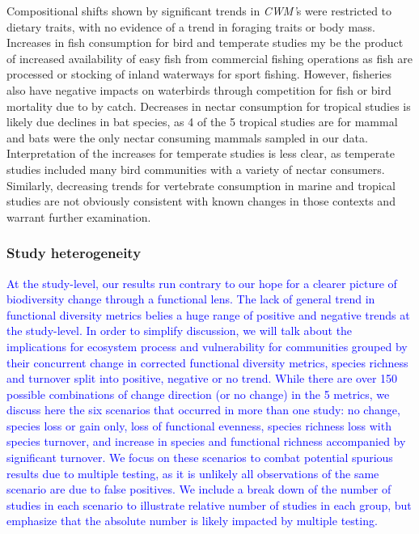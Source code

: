 \documentclass{article}
\begin{document}
Compositional shifts shown by significant trends in \emph{CWM'}s were
restricted to dietary traits, with no evidence of a trend in foraging
traits or body mass. Increases in fish consumption for bird and
temperate studies my be the product of increased availability of easy
fish from commercial fishing operations as fish are processed or
stocking of inland waterways for sport fishing. However, fisheries also
have negative impacts on waterbirds through competition for fish or bird
mortality due to by catch. Decreases in nectar consumption for tropical
studies is likely due declines in bat species, as 4 of the 5 tropical
studies are for mammal and bats were the only nectar consuming mammals
sampled in our data. Interpretation of the increases for temperate
studies is less clear, as temperate studies included many bird
communities with a variety of nectar consumers. Similarly, decreasing
trends for vertebrate consumption in marine and tropical studies are not
obviously consistent with known changes in those contexts and warrant
further examination.

\hypertarget{study-heterogeneity}{%
\subsubsection{Study heterogeneity}\label{study-heterogeneity}}

\textcolor{blue}{At the study-level, our results run contrary to our hope for a clearer picture of biodiversity change through a functional lens. The lack of general trend in functional diversity metrics belies a huge range of positive and negative trends at the study-level. In order to simplify discussion, we will talk about the implications for ecosystem process and vulnerability for communities grouped by their concurrent change in corrected functional diversity metrics, species richness and turnover split into positive, negative or no trend. While there are over 150 possible combinations of change direction (or no change) in the 5 metrics, we discuss here the six scenarios that occurred in more than one study: no change, species loss or gain only, loss of functional evenness, species richness loss with species turnover, and increase in species and functional richness accompanied by significant turnover. We focus on these scenarios to combat potential spurious results due to multiple testing, as it is unlikely all observations of the same scenario are due to false positives. We include a break down of the number of studies in each scenario to illustrate relative number of studies in each group, but emphasize that the absolute number is likely impacted by multiple testing.}
\end{document}
